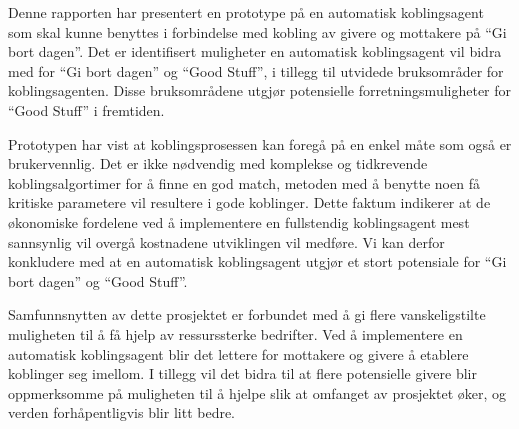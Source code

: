 Denne rapporten har presentert en prototype på en automatisk koblingsagent som skal kunne benyttes i forbindelse med kobling av givere og mottakere på ``Gi bort dagen''. Det er identifisert muligheter en automatisk koblingsagent vil bidra med for ``Gi bort dagen'' og ``Good Stuff'', i tillegg til utvidede bruksområder for koblingsagenten. Disse bruksområdene utgjør potensielle forretningsmuligheter for ``Good Stuff'' i fremtiden.

Prototypen har vist at koblingsprosessen kan foregå på en enkel måte som også er brukervennlig. Det er ikke nødvendig med komplekse og tidkrevende koblingsalgortimer for å finne en god match, metoden med å benytte noen få kritiske parametere vil resultere i gode koblinger. Dette faktum indikerer at de økonomiske fordelene ved å implementere en fullstendig koblingsagent mest sannsynlig vil overgå kostnadene utviklingen vil medføre. Vi kan derfor konkludere med at en automatisk koblingsagent utgjør et stort potensiale for ``Gi bort dagen'' og ``Good Stuff''. 

Samfunnsnytten av dette prosjektet er forbundet med å gi flere vanskeligstilte muligheten til å få hjelp av ressurssterke bedrifter. Ved å implementere en automatisk koblingsagent blir det lettere for mottakere og givere å etablere koblinger seg imellom. I tillegg vil det bidra til at flere potensielle givere blir oppmerksomme på muligheten til å hjelpe slik at omfanget av prosjektet øker, og verden forhåpentligvis blir litt bedre. 

